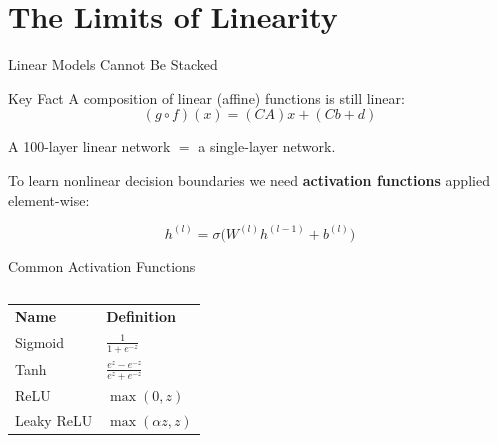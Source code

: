 \documentclass[aspectratio=169, professionalfonts]{beamer}
\begin{document}
\section{The Limits of Linearity}

\begin{frame}{Linear Models Cannot Be Stacked}

\begin{alertblock}{Key Fact}
A composition of linear (affine) functions is still linear:
$$(g \circ f)(x) = (CA)x + (Cb + d)$$
\end{alertblock}

\bigskip

A 100-layer linear network $=$ a single-layer network.

\bigskip

To learn nonlinear decision boundaries we need
\textbf{activation functions} applied element-wise:

$$h^{(l)} = \sigma\!\bigl(W^{(l)} h^{(l-1)} + b^{(l)}\bigr)$$

\end{frame}

\begin{frame}{Common Activation Functions}

\begin{columns}[c]
\begin{center}
\small
\begin{tabular}{ll}
\textbf{Name} & \textbf{Definition} \\[4pt]
Sigmoid & $\frac{1}{1+e^{-z}}$ \\[6pt]
Tanh & $\frac{e^z - e^{-z}}{e^z + e^{-z}}$ \\[6pt]
ReLU & $\max(0, z)$ \\[6pt]
Leaky ReLU & $\max(\alpha z, z)$
\end{tabular}
\end{center}

\end{columns}

\end{frame}
\end{document}
